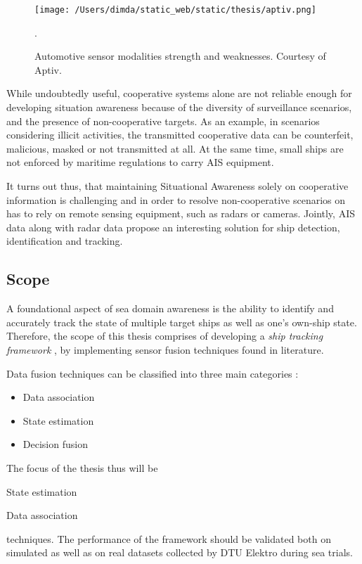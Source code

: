 \begin{figure}[H]
	\centering
	\texttt{[image: /Users/dimda/static\_web/static/thesis/aptiv.png]}
	\caption{Automotive sensor modalities strength and weaknesses. Courtesy of Aptiv.}.
	\label{fig:taylor_approximation}
\end{figure}

While undoubtedly useful, cooperative systems alone are not reliable enough for developing situation awareness because of the diversity of surveillance scenarios, and the presence of non-cooperative targets. As an example, in scenarios considering illicit activities, the transmitted cooperative data can be counterfeit, malicious, masked or not transmitted at all. At the same time, small ships are not enforced by maritime regulations to carry AIS equipment. 

It turns out thus, that maintaining Situational Awareness solely on cooperative information is challenging and in order to resolve non-cooperative scenarios on has to rely on remote sensing equipment, such as radars or cameras. Jointly, AIS data along with radar data propose an interesting solution for ship detection, identification and tracking.


\subsection{Scope}


A foundational aspect of sea domain awareness is the ability to identify and accurately track the state of multiple target ships as well as one's own-ship state. Therefore, the scope of this thesis comprises of developing a \emph{ship tracking framework} , by implementing sensor fusion techniques found in literature.

Data fusion techniques can be classified into three main categories \cite{nedo2013}:
\begin{itemize}
	\item Data association
	\item State estimation
	\item Decision fusion
\end{itemize}

 The focus of the thesis thus will be\begin{mylist}
	\item State estimation
	\item Data association
\end{mylist}
techniques. The performance of the framework should be validated both on simulated as well as on real datasets collected by DTU Elektro during sea trials.

